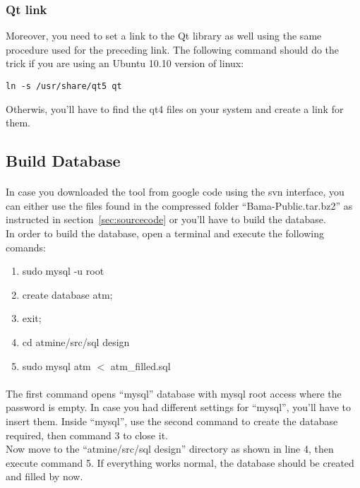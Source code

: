\documentclass{article}
\begin{document}
\subsubsection{Qt link}
Moreover, you need to set a link to the Qt library as well using the same procedure used for the preceding link. 
The following command should do the trick if you are using an Ubuntu 10.10 version of linux:
\begin{verbatim}
ln -s /usr/share/qt5 qt
\end{verbatim}
Otherwis, you'll have to find the qt4 files on your system and create a link for them.

\subsection{Build Database}

\paragraph{}
In case you downloaded the tool from google code using the svn interface, you can either use the files found in the compressed folder ``Bama-Public.tar.bz2'' as instructed in section~\ref{sec:sourcecode} or you'll have to build the database.\\
In order to build the database, open a terminal and execute the following comands:

\begin{enumerate}
\item sudo mysql -u root
\item create database atm;
\item exit;
\item cd atmine/src/sql design
\item sudo mysql atm $<$ atm\_filled.sql
\end{enumerate}

\paragraph{}
The first command opens ``mysql'' database with mysql root access where the password is empty. In case you had different settings for ``mysql'', you'll have to insert them. Inside ``mysql'', use the second command to create the database required, then command 3 to close it.\\
Now move to the ``atmine/src/sql design'' directory as shown in line 4, then execute command 5. If everything works normal, the database should be created and filled by now.
\end{document}
